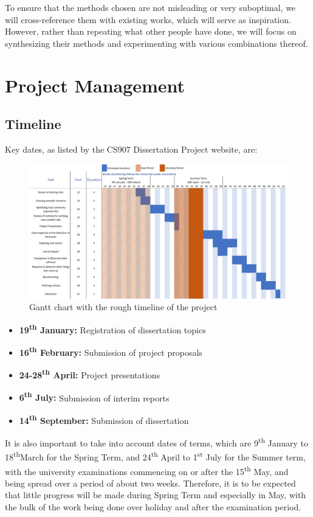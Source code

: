 \documentclass[11pt,journal]{IEEEtran}
\begin{document}
	To ensure that the methods chosen are not misleading or very suboptimal, we will cross-reference them with existing works, which will serve as inspiration. However, rather than repeating what other people have done, we will focus on synthesizing their methods and experimenting with various combinations thereof. 
	
	\section{Project Management}

	
	\subsection{Timeline}
	Key dates, as listed by the CS907 Dissertation Project website, are:

	\begin{figure}[]
		\includegraphics[width=\textwidth]{gantt_chart.png}
		\caption{Gantt chart with the rough timeline of the project}
	\end{figure}
	\begin{itemize}
		\item \textbf{19\textsuperscript{th} January:} Registration of dissertation topics
		\item \textbf{16\textsuperscript{th} February:} Submission of project proposals
		\item \textbf{24-28\textsuperscript{th} April:} Project presentations
		\item \textbf{6\textsuperscript{th} July:} Submission of interim reports
		\item \textbf{14\textsuperscript{th} September:} Submission of dissertation
	\end{itemize}
	

	It is also important to take into account dates of terms, which are 9\textsuperscript{th} January to 18\textsuperscript{th}March for the Spring Term, and 24\textsuperscript{th} April to 1\textsuperscript{st} July for the Summer term, with the university examinations commencing on or after the 15\textsuperscript{th} May, and being spread over a period of about two weeks. Therefore, it is to be expected that little progress will be made during Spring Term and especially in May, with the bulk of the work being done over holiday and after the examination period.
	
\end{document}
